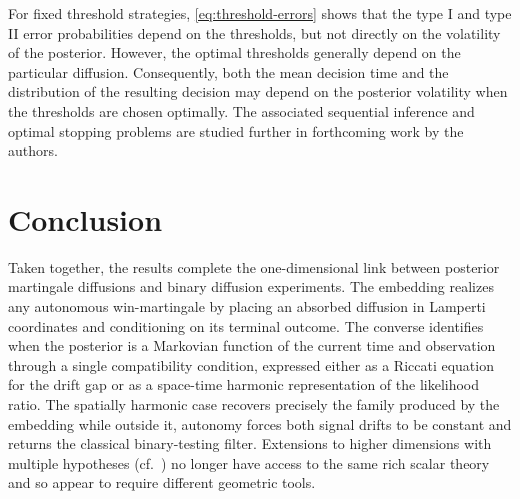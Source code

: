 \documentclass[11pt, reqno]{amsart}
\theoremstyle{plain}
\theoremstyle{remark}
\numberwithin{equation}{section}
\begin{document}
For fixed threshold strategies, \eqref{eq:threshold-errors} shows that the type I and type II error probabilities depend on the thresholds, but not directly on the volatility of the posterior. However, the optimal thresholds generally depend on the particular diffusion. Consequently, both the mean decision time and the distribution of the resulting decision may depend on the posterior volatility when the thresholds are chosen optimally. The associated sequential inference and optimal stopping problems are studied further in forthcoming work by the authors.


\section{Conclusion}

Taken together, the results complete the one-dimensional link between posterior martingale diffusions and binary diffusion experiments. The embedding realizes any autonomous win-martingale by placing an absorbed diffusion in Lamperti coordinates and conditioning on its terminal outcome. The converse identifies when the posterior is a Markovian function of the current time and observation through a single compatibility condition, expressed either as a Riccati equation for the drift gap or as a space-time harmonic representation of the likelihood ratio. The spatially harmonic case recovers precisely the family produced by the embedding while outside it, autonomy forces both signal drifts to be constant and returns the classical binary-testing filter. Extensions to higher dimensions with multiple hypotheses (cf.~\cite{bayraktar-wang2025, caffarelli1981sequential, ekstrom2022multi}) no longer have access to the same rich scalar theory and so appear to require different geometric tools. 


%


\end{document}
